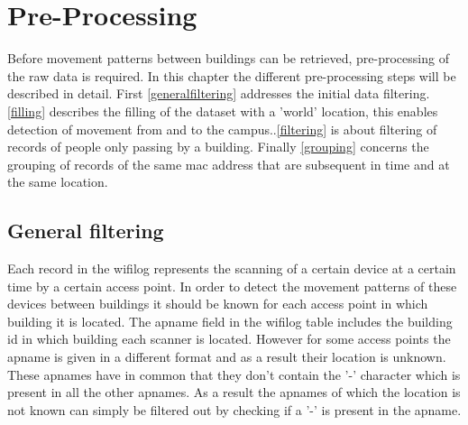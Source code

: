 \section{Pre-Processing}\label{preprocessing}
Before movement patterns between buildings can be retrieved, pre-processing of the raw data is required. In this chapter the different pre-processing steps will be described in detail. First \autoref{generalfiltering} addresses the initial data filtering. \autoref{filling} describes the filling of the dataset with a 'world' location, this enables detection of movement from and to the campus..\autoref{filtering} is about filtering of records of people only passing by a building. Finally \autoref{grouping} concerns the grouping of records of the same mac address that are subsequent in time and at the same location.
\subsection{General filtering}\label{generalfiltering}
Each record in the wifilog represents the scanning of a certain device at a certain time by a certain access point. In order to detect the movement patterns of these devices between buildings it should be known for each access point in which building it is located. The apname field in the wifilog table includes the building id in which building each scanner is located. However for some access points the apname is given in a different format and as a result their location is unknown. These apnames have in common that they don’t contain the '-' character which is present in all the other apnames. As a result the apnames of which the location is not known can simply be filtered out by checking if a '-' is present in the apname. 

